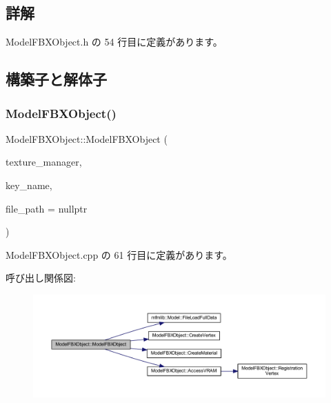 \subsection{詳解}


 Model\+F\+B\+X\+Object.\+h の 54 行目に定義があります。



\subsection{構築子と解体子}
\mbox{\label{class_model_f_b_x_object_a45586ead07b17f4a90ba320c41d7f1c3}} 
\subsubsection{\texorpdfstring{Model\+F\+B\+X\+Object()}{ModelFBXObject()}}
{\footnotesize\ttfamily Model\+F\+B\+X\+Object\+::\+Model\+F\+B\+X\+Object (\begin{DoxyParamCaption}\item[{\mbox{\hyperlink{class_texture_manager}{Texture\+Manager}} $\ast$}]{texture\+\_\+manager,  }\item[{const std\+::string $\ast$}]{key\+\_\+name,  }\item[{const std\+::string $\ast$}]{file\+\_\+path = {\ttfamily nullptr} }\end{DoxyParamCaption})}



 Model\+F\+B\+X\+Object.\+cpp の 61 行目に定義があります。

呼び出し関係図\+:
\nopagebreak
\begin{figure}[H]
\begin{center}
\leavevmode
\includegraphics[width=350pt]{class_model_f_b_x_object_a45586ead07b17f4a90ba320c41d7f1c3_cgraph}
\end{center}
\end{figure}
\mbox{\label{class_model_f_b_x_object_a3fa838235e50d797539d6b266f8e2c96}} 
